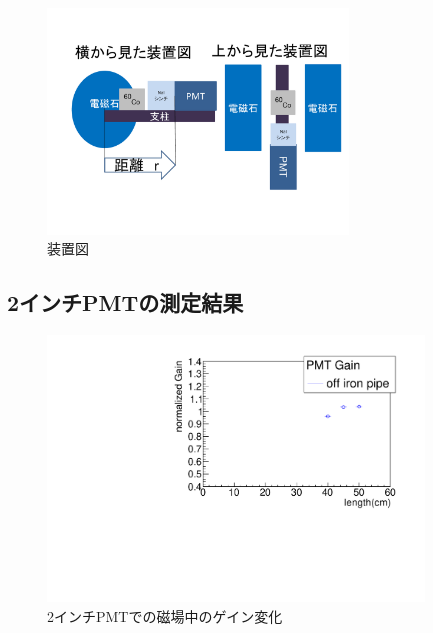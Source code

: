 \begin{figure}[H]
	\centering
		\includegraphics[width=8cm]{fig/iguchi/soutizu1.pdf}
	\caption{装置図}
	\label{soutizu1}
\end{figure}

\subsection{2インチPMTの測定結果}
\begin{figure}[H]
	\centering
		\includegraphics[angle=-90,width=10cm]{fig/iguchi/plot2inchPMT.pdf}
	\caption{2インチPMTでの磁場中のゲイン変化}
	\label{plot2inchoff}
\end{figure}


